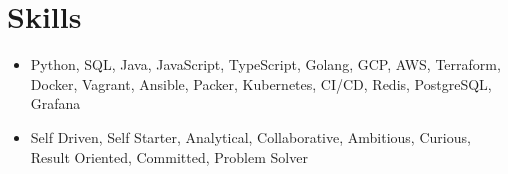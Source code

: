 \section{Skills}
\begin{itemize}
  \item Python, SQL, Java, JavaScript, TypeScript, Golang, GCP, AWS, Terraform, Docker, Vagrant, Ansible, Packer, Kubernetes, CI/CD, Redis, PostgreSQL, Grafana
  \item Self Driven, Self Starter, Analytical, Collaborative, Ambitious, Curious, Result Oriented, Committed, Problem Solver
\end{itemize}
